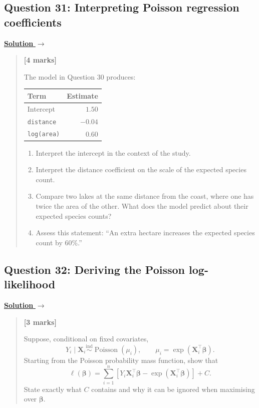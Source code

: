 \documentclass[11pt,a4paper]{article}
\newenvironment{examquestion}[2]
  {\subsection{#1}\label{question:\arabic{subsection}}\label{#2}%
   \noindent\hyperref[answer:\arabic{subsection}]{\textbf{Solution} $\rightarrow$}%
   \begin{quote}\color{statgrey}}
  {\end{quote}}
\begin{document}
\clearpage

\begin{examquestion}{Question 31: Interpreting Poisson regression coefficients}{question:practice-interpreting-poisson-regression-coefficients}
\textbf{[4 marks]}

The model in Question 30 produces:
\begin{center}
\begin{tabular}{lr}
\hline
Term & Estimate\\
\hline
Intercept & $1.50$\\
\texttt{distance} & $-0.04$\\
\texttt{log(area)} & $0.60$\\
\hline
\end{tabular}
\end{center}
\begin{enumerate}[label=(\alph*)]
  \item Interpret the intercept in the context of the study.
  \item Interpret the distance coefficient on the scale of the expected
        species count.
  \item Compare two lakes at the same distance from the coast, where one
        has twice the area of the other. What does the model predict about
        their expected species counts?
  \item Assess this statement: ``An extra hectare increases the expected
        species count by 60\%.''
\end{enumerate}
\end{examquestion}

\clearpage

\begin{examquestion}{Question 32: Deriving the Poisson log-likelihood}{question:practice-deriving-the-poisson-log-likelihood}
\textbf{[3 marks]}

Suppose, conditional on fixed covariates,
\[
Y_i\mid\mathbf X_i
\overset{\mathrm{ind}}{\sim}\operatorname{Poisson}(\mu_i),
\qquad
\mu_i=\exp(\mathbf X_i^\top\boldsymbol\beta).
\]
Starting from the Poisson probability mass function, show that
\[
\ell(\boldsymbol\beta)
=\sum_{i=1}^{n}\left[
Y_i\mathbf X_i^\top\boldsymbol\beta
-\exp(\mathbf X_i^\top\boldsymbol\beta)
\right]+C.
\]
State exactly what $C$ contains and why it can be ignored when maximising
over $\boldsymbol\beta$.
\end{examquestion}

\clearpage
\end{document}
